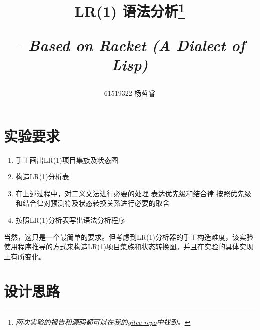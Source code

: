 \documentclass[lang=cn]{ctexart}
\title{
    LR(1) 语法分析\footnote{\textit{两次实验的报告和源码都可以在我的\hyperref{https://gitee.com/jerry_yangClover/racket-pascal-mini-cp}{}{}{gitee repo}中找到。}}
    \begin{flushright}\normalsize
        \textit{-- Based on Racket (A Dialect of Lisp)}
    \end{flushright}
}
\author{61519322 杨哲睿}
\begin{document}
\maketitle

\tableofcontents



\newpage

\section{实验要求}

\begin{enumerate}
    \item 手工画出LR(1)项目集族及状态图
    \item 构造LR(1)分析表
    \item 在上述过程中，对二义文法进行必要的处理
    \subitem 表达优先级和结合律
    \subitem 按照优先级和结合律对预测符及状态转换关系进行必要的取舍
    \item 按照LR(1)分析表写出语法分析程序
\end{enumerate}

当然，这只是一个最简单的要求。但考虑到LR(1)分析器的手工构造难度，该实验使用{\heiti 程序推导}的方式来构造LR(1)项目集族和状态转换图。并且在实验的具体实现上有所变化。

\section{设计思路}
\end{document}
